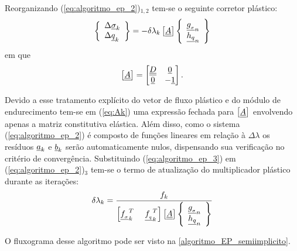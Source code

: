 Reorganizando (\ref{eq:algoritmo_ep_2})$_{1,2}$ tem-se o seguinte corretor plástico:
\begin{equation}
	\label{eq:algoritmo_ep_3}
	\left\{
	\begin{array}{lcl}
		\Delta \underline \sigma_k \\
		\Delta \underline q_k
	\end{array}
	\right\} = -\delta\lambda_k \left[ \underline{\underline A} \right]
	\left\{	
	\begin{array}{lcl}
		\underline{g_{_\sigma}}_n \\
		\underline{h_q}_n
	\end{array}
	\right\}
\end{equation}
em que
\begin{equation}
	\label{eq:Ak}
	\left[ \underline{\underline A} \right] =
	\begin{bmatrix}
		\underline{\underline D} & \underline{0} \\
		\underline{0} & -\underline{1}
	\end{bmatrix}.
\end{equation}

Devido a esse tratamento explícito do vetor de fluxo plástico e do módulo de endurecimento tem-se em (\ref{eq:Ak}) uma expressão fechada para $\left[\underline{\underline A} \right]$ envolvendo apenas a matriz constitutiva elástica. Além disso, como o sistema (\ref{eq:algoritmo_ep_2}) é composto de funções lineares em relação à $\Delta \lambda$ os resíduos $\underline{a}_k$ e $\underline{b}_k$ serão automaticamente nulos, dispensando sua verificação no critério de convergência. Substituindo (\ref{eq:algoritmo_ep_3}) em (\ref{eq:algoritmo_ep_2})$_3$ tem-se o termo de atualização do multiplicador plástico durante as iterações:
\begin{equation}
	\label{eq:deltalambdak}
	\delta \lambda_k = \dfrac{f_k}{\left[\underline{f_{_\sigma}}_k^T~~~~\underline{f_{_q}}_k^T\right]\left[\underline{\underline A} \right]\left\{ 
	\begin{array}{lcl}
			\underline{g_{_\sigma}}_n \\ 
			\underline{h_q}_n
	\end{array}\right\}}
\end{equation}

O fluxograma desse algoritmo pode ser visto na \autoref{algoritmo_EP_semiimplicito}.

